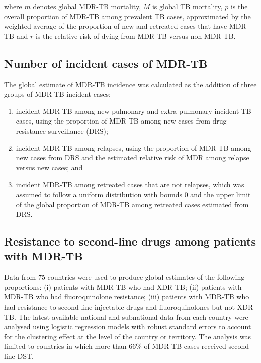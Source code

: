 where $m$ denotes global MDR-TB mortality, $M$ is global TB mortality, $p$ is the overall proportion of MDR-TB among prevalent TB cases, approximated by the weighted average of the proportion of new and retreated cases that have MDR-TB and $r$ is the relative risk of dying from MDR-TB versus non-MDR-TB.

\subsection{Number of incident cases of MDR-TB}

The global estimate of MDR-TB incidence was calculated as the addition of three groups of MDR-TB incident cases:
\begin{enumerate}
\item incident MDR-TB among new pulmonary and extra-pulmonary incident TB cases, using the proportion of MDR-TB among new cases from drug resistance surveillance (DRS); 
\item incident MDR-TB among relapses, using the proportion of MDR-TB among new cases from DRS and the estimated relative risk of MDR among relapse versus new cases; and
\item incident MDR-TB among retreated cases that are not relapses, which was assumed to follow a uniform distribution with bounds 0 and the upper limit of the global proportion of MDR-TB among retreated cases estimated from DRS. 
\end{enumerate}


\subsection{Resistance to second-line drugs among patients with MDR-TB}

Data from 75 countries were used to produce global estimates of the following proportions: (i) patients with MDR-TB who had XDR-TB; (ii) patients with MDR-TB who had fluoroquinolone resistance; (iii) patients with MDR-TB who had resistance to second-line injectable drugs and fluoroquinolones but not XDR-TB. The latest available national and subnational data from each country were analysed using logistic regression models with robust standard errors to account for the clustering effect at the level of the country or territory. The analysis was limited to countries in which more than 66\% of MDR-TB cases received second-line DST.




